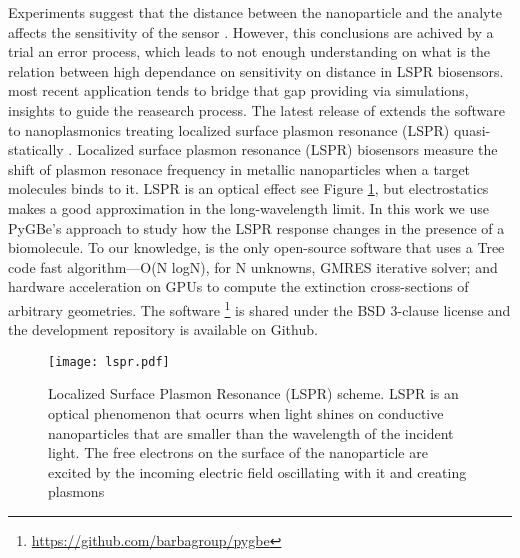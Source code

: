 




Experiments suggest that the distance between the nanoparticle and the analyte 
affects the sensitivity of the sensor \cite{HaesETal2004}. However, this conclusions
are achived by a trial an error process, which leads to not enough understanding
on what is the relation between high dependance on sensitivity on distance in LSPR
biosensors. \pygbe most recent application \cite{ClementiETal2017} tends to 
bridge that gap providing via simulations, insights to guide the reasearch process.
The latest release of \pygbe extends the software to nanoplasmonics treating 
localized surface plasmon resonance (LSPR) quasi-statically \cite{MayergoyzZhang2007}.
Localized surface plasmon resonance (LSPR) biosensors measure the shift of 
plasmon resonace frequency in metallic nanoparticles when a target molecules 
binds to it. LSPR is an optical effect see Figure \ref{fig:lspr}, but electrostatics 
makes a good approximation in the long-wavelength limit. In this work we use
PyGBe's approach to study how the LSPR response changes in the presence of a 
biomolecule. To our knowledge, \pygbe is the only open-source software that uses a Tree code 
fast algorithm—O(N logN), for N unknowns, GMRES iterative solver; and hardware 
acceleration on GPUs to compute the extinction cross-sections of arbitrary 
geometries. The software \footnote{\url{https://github.com/barbagroup/pygbe}} is shared 
under the BSD 3-clause license and the development repository is available on 
Github.



\begin{figure}[h] %
   \centering
   \texttt{[image: lspr.pdf]} 
   \caption{Localized Surface Plasmon Resonance (LSPR) scheme. LSPR is an 
            optical phenomenon that ocurrs when light shines on conductive 
            nanoparticles that are smaller than the wavelength of the incident 
            light. The free electrons on the surface of the nanoparticle are 
            excited by the incoming electric field oscillating with it and 
            creating plasmons}
   \label{fig:lspr}
\end{figure}




